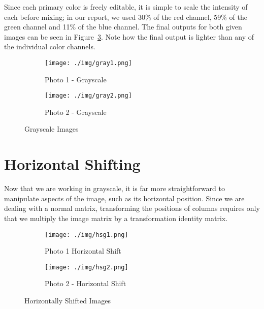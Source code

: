 \documentclass[10pt]{report}
\begin{document}
Since each primary color is freely editable, it is simple to scale the intensity of each before mixing; in our report, we used 30\% of the red channel, 59\% of the green channel and 11\% of the blue channel. The final outputs for both given images can be seen in Figure~\ref{fig:gray_images}. Note how the final output is lighter than any of the individual color channels.

    \begin{figure}[ht]
        \centering
        \begin{subfigure}{\textwidth}
            \centering
            \texttt{[image: ./img/gray1.png]}
            \caption{Photo 1 - Grayscale}
            \label{fig:p1g}
        \end{subfigure}
        \begin{subfigure}{\textwidth}
            \centering
            \texttt{[image: ./img/gray2.png]}
            \caption{Photo 2 - Grayscale}
            \label{fig:p2g}
        \end{subfigure}
        \caption{Grayscale Images}
        \label{fig:gray_images}
    \end{figure}

\section{Horizontal Shifting}

Now that we are working in grayscale, it is far more straightforward to manipulate aspects of the image, such as its horizontal position.  Since we are dealing with a normal matrix, transforming the positions of columns requires only that we multiply the image matrix by a transformation identity matrix.

    \begin{figure}[ht]
        \centering
        \begin{subfigure}{\textwidth}
            \centering
            \texttt{[image: ./img/hsg1.png]}
            \caption{Photo 1 Horizontal Shift}
            \label{fig:p1hg}
        \end{subfigure}
        \begin{subfigure}{\textwidth}
            \centering
            \texttt{[image: ./img/hsg2.png]}
            \caption{Photo 2 - Horizontal Shift}
            \label{fig:p2hg}
        \end{subfigure}
        \caption{Horizontally Shifted Images}
        \label{fig:hs_images}
    \end{figure}
\end{document}
